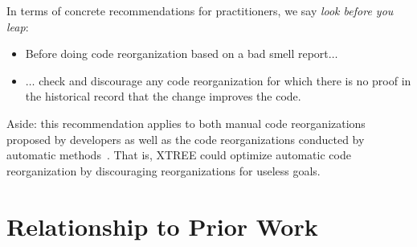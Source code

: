 \documentclass[twocolumn,5p]{elsarticle}
\newcommand{\bi}{\begin{itemize}[leftmargin=0.4cm]}
\newcommand{\ei}{\end{itemize}}
\theoremstyle{break}
\begin{document}
	{\color{steel}In terms of concrete recommendations for
		practitioners, we say {\em look before you leap}:
		\bi
		\item Before doing  code reorganization based on a bad smell 
		report$\ldots$ 
		\item $\ldots$ check and discourage any code reorganization   for which 
		there 
		is no proof
		in the historical record that the change improves the code.
		\ei
		Aside: this recommendation   applies to both manual code 
		reorganizations proposed by developers
		as well as the code reorganizations conducted by automatic 
		methods~\cite{mkaouer2015many}. That is, XTREE could optimize automatic
		code reorganization by discouraging reorganizations for useless goals.}
		
	
	
	\section{Relationship to Prior Work }
\end{document}
